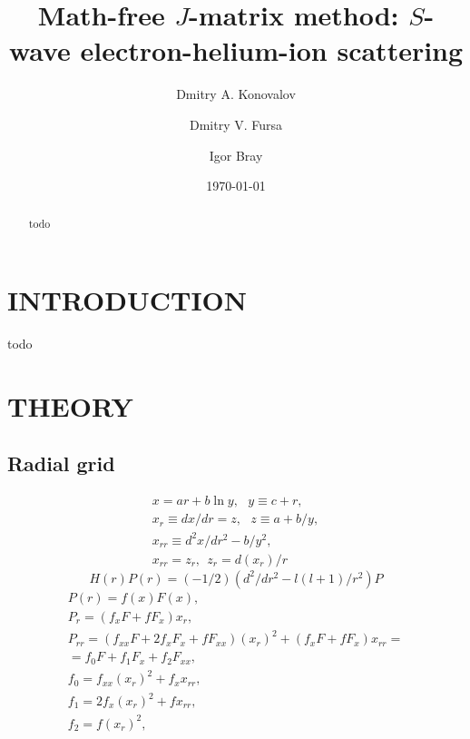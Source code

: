 \documentclass[aip
, pra
, showpacs
, aps
, twocolumn
, groupedaddress
, floatfix
]{revtex4}
\newcommand{\beq}{\begin{equation}}
\newcommand{\eeq}{\end{equation}}
\newcommand{\barr}{\begin{array}}
\newcommand{\earr}{\end{array}}
\begin{document}
\title {Math-free $J$-matrix method: $S$-wave electron-helium-ion scattering}

\author{Dmitry A. Konovalov}

\author{Dmitry V. Fursa}

\author{Igor Bray}



\date{\today}

\begin{abstract}
todo

\end{abstract}

\maketitle



\section{INTRODUCTION}

todo

\section{THEORY}

\subsection{Radial grid}
\beq \barr{l}
x = ar + b \ln y,\ \ \ y \equiv c+r,\\
x_r \equiv d x / d r = z, \ \ \ z \equiv a + b / y,\\
x_{rr} \equiv d^2 x / dr^2 -b / y^2,\\
x_{rr} = z_r, \ \ z_r = d(x_r)/r
\earr \eeq
\beq
H(r) P(r) = (-1/2) ( d^2 /dr^2 - l(l+1)/r^2) P
\eeq
\beq \barr{l}
P(r) = f(x) F(x), \\
P_r = (f_x F  + f F_x) x_r,\\
P_{rr} = (f_{xx} F + 2f_x F_x + f F_{xx}) (x_r)^2 + (f_x F  + f F_x) x_{rr} =\\
= f_0 F + f_1 F_x + f_2 F_{xx},\\
f_0 = f_{xx}  (x_r)^2 + f_x  x_{rr},\\
f_1 = 2 f_x (x_r)^2 + f  x_{rr},\\
f_2 = f (x_r)^2,
\earr \eeq
\end{document}
